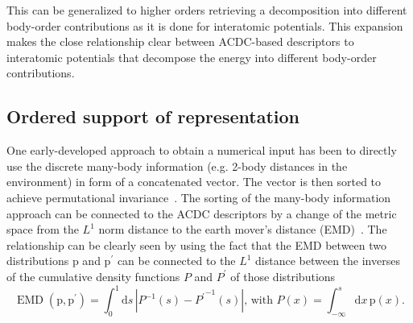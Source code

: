 This can be generalized to higher orders retrieving a decomposition into different body-order contributions as it is done for interatomic potentials.
This expansion makes the close relationship clear between ACDC-based descriptors to interatomic potentials that decompose the energy into different body-order contributions.

\subsection{Ordered support of representation}
One early-developed approach to obtain a numerical input has been to directly use the discrete many-body information (e.g. 2-body distances in the environment) in form of a concatenated vector.
The vector is then sorted to achieve permutational invariance~\cite{hansen2015machine, barker2016localized, huang2016communication}.
The sorting of the many-body information approach can be connected to the ACDC descriptors by a change of the metric space from the $L^1$ norm distance to the earth mover's distance (EMD)~\cite{will+19jcp}.
The relationship can be clearly seen by using the fact that the EMD between two distributions $\textrm{p}$ and $\textrm{p}^\prime$ can be connected to the $L^1$ distance between the inverses of the cumulative density functions $P$ and $P^\prime$ of those distributions
\begin{equation}
  \label{eq:emd_lp_duality}
  \operatorname{EMD}(\textrm{p}, \textrm{p}^\prime)=\int_0^1\mathrm{d}{s}\,\left|P^{-1}(s) -{P^{\prime}}^{-1}(s)\right|\text{, with }P(x)=\int_{-\infty}^s \mathrm{d}x\, \textrm{p}(x).
\end{equation}
